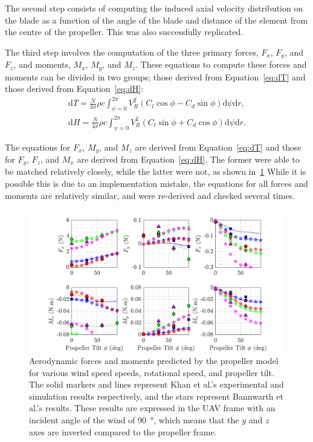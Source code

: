 \documentclass[a4paper,12pt]{article}
\begin{document}
            The second step consists of computing the induced axial velocity distribution on the blade as a function of the angle of the blade and distance of the element from the centre of the propeller. This was also successfully replicated.

            The third step involves the computation of the three primary forces, \(F_x\), \(F_y\), and \(F_z\), and moments, \(M_x\), \(M_y\), and \(M_z\). These equations to compute these forces and moments can be divided in two groups; those derived from Equation~\eqref{eq:dT} and those derived from Equation~\eqref{eq:dH}:
            \begin{align}
                \mathrm{d} T = \frac{N}{4\pi}\rho c \int_{\psi=0}^{2\pi} V^2_R \left( C_l \cos \phi - C_d \sin \phi \right) \mathrm{d} \psi \mathrm{d} r,  \label{eq:dT} \\
                \mathrm{d} H = \frac{N}{4\pi}\rho c \int_{\psi=0}^{2\pi} V^2_R \left( C_l \sin \phi + C_d \cos \phi \right) \mathrm{d} \psi \mathrm{d} r. \label{eq:dH}
            \end{align}

            The equations for \(F_x\), \(M_y\), and \(M_z\) are derived from Equation~\eqref{eq:dT} and those for \(F_y\), \(F_z\), and \(M_x\) are derived from Equation~\eqref{eq:dH}. The former were able to be matched relatively closely, while the latter were not, as shown in~\ref{fig:aero_fm} While it is possible this is due to an implementation mistake, the equations for all forces and moments are relatively similar, and were re-derived and checked several times.

            \begin{figure}[h!]
                \centering%
                \includegraphics{aero_fm.pdf}%
                \caption{Aerodynamic forces and moments predicted by the propeller model for various wind speed speeds, rotational speed, and propeller tilt. The solid markers and lines represent Khan et al.'s experimental and simulation results respectively, and the stars represent Bannwarth et al.'s results. These results are expressed in the UAV frame with an incident angle of the wind of \SI{90}{\degree}, which means that the \(y\) and \(z\) axes are inverted compared to the propeller frame.}\label{fig:aero_fm}
            \end{figure}
\end{document}
